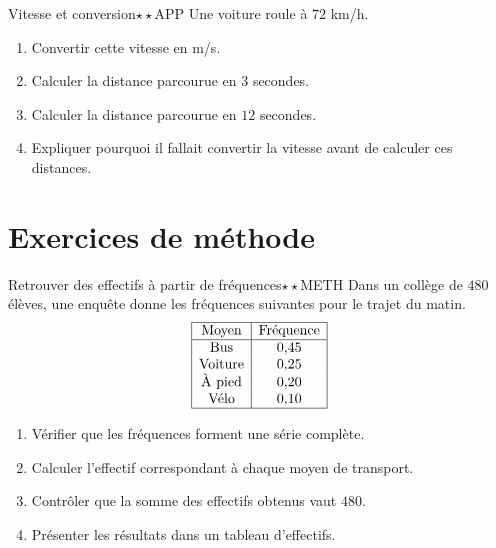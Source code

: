 \documentclass[11pt,a4paper]{article}
\newcounter{exo}
\newcounter{corr}
\begin{document}
\begin{exobox}{Vitesse et conversion}{$\star\star$}{APP}
Une voiture roule à $72$ km/h.
\begin{enumerate}
\item Convertir cette vitesse en m/s.
\item Calculer la distance parcourue en $3$ secondes.
\item Calculer la distance parcourue en $12$ secondes.
\item Expliquer pourquoi il fallait convertir la vitesse avant de calculer ces distances.
\end{enumerate}
\end{exobox}

\section{Exercices de méthode}

\begin{exobox}{Retrouver des effectifs à partir de fréquences}{$\star\star$}{METH}
Dans un collège de $480$ élèves, une enquête donne les fréquences suivantes pour le trajet du matin.
\[
\begin{array}{|c|c|}
\hline
\text{Moyen} & \text{Fréquence} \\
\hline
\text{Bus} & 0{,}45 \\
\text{Voiture} & 0{,}25 \\
\text{À pied} & 0{,}20 \\
\text{Vélo} & 0{,}10 \\
\hline
\end{array}
\]
\begin{enumerate}
\item Vérifier que les fréquences forment une série complète.
\item Calculer l'effectif correspondant à chaque moyen de transport.
\item Contrôler que la somme des effectifs obtenus vaut $480$.
\item Présenter les résultats dans un tableau d'effectifs.
\end{enumerate}
\end{exobox}
\end{document}
